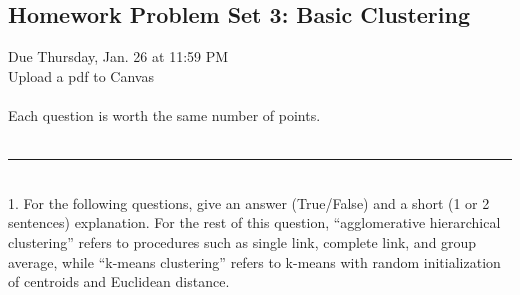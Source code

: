 \documentclass[11pt]{article}
\begin{document}
\def\Q#1#2{\vspace{1ex}\hrule\vspace{1ex}{\bf \noindent Question #1: #2}\\}
\def\text#1{{\rm #1}}
\begin{center}
\section*{Homework Problem Set 3: Basic Clustering}
\end{center}
Due Thursday, Jan. 26 at 11:59 PM  \\
Upload a pdf to Canvas  \\ \\
Each question is worth the same number of points. \\ \\
\Q{1}{}
1.	For the following questions, give an answer (True/False) and a short (1 or 2 sentences) explanation.   For the rest of this question, “agglomerative hierarchical clustering” refers to procedures such as single link, complete link, and group average, while “k-means clustering” refers to k-means with random initialization of centroids and Euclidean distance.
\end{document}
